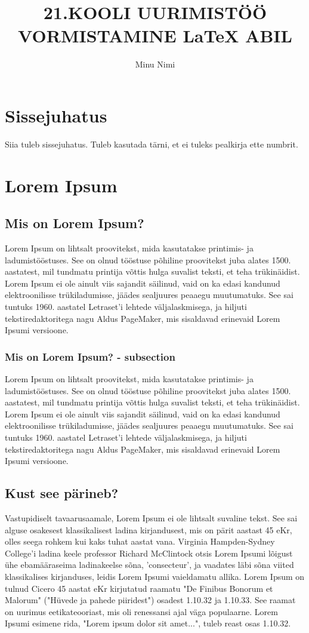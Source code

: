 \documentclass{21kuur}
\title{21.KOOLI UURIMISTÖÖ VORMISTAMINE LaTeX ABIL}
\author{Minu Nimi}
\begin{document}
\maketitle

\chapter*{Sissejuhatus}
Siia tuleb sissejuhatus. Tuleb kasutada tärni, et ei tuleks pealkirja ette numbrit. 


\chapter{Lorem Ipsum}

\section{Mis on Lorem Ipsum?}
Lorem Ipsum on lihtsalt proovitekst, mida kasutatakse printimis- ja ladumistööstuses. See on olnud tööstuse põhiline proovitekst juba alates 1500. aastatest, mil tundmatu printija võttis hulga suvalist teksti, et teha trükinäidist. Lorem Ipsum ei ole ainult viis sajandit säilinud, vaid on ka edasi kandunud elektroonilisse trükiladumisse, jäädes sealjuures peaaegu muutumatuks. See sai tuntuks 1960. aastatel Letraset'i lehtede väljalaskmisega, ja hiljuti tekstiredaktoritega nagu Aldus PageMaker, mis sisaldavad erinevaid Lorem Ipsumi versioone.

\subsection{Mis on Lorem Ipsum? - subsection}
Lorem Ipsum on lihtsalt proovitekst, mida kasutatakse printimis- ja ladumistööstuses. See on olnud tööstuse põhiline proovitekst juba alates 1500. aastatest, mil tundmatu printija võttis hulga suvalist teksti, et teha trükinäidist. Lorem Ipsum ei ole ainult viis sajandit säilinud, vaid on ka edasi kandunud elektroonilisse trükiladumisse, jäädes sealjuures peaaegu muutumatuks. See sai tuntuks 1960. aastatel Letraset'i lehtede väljalaskmisega, ja hiljuti tekstiredaktoritega nagu Aldus PageMaker, mis sisaldavad erinevaid Lorem Ipsumi versioone.

\section{Kust see pärineb?}
Vastupidiselt tavaarusaamale, Lorem Ipsum ei ole lihtsalt suvaline tekst. See sai alguse osakesest klassikalisest ladina kirjandusest, mis on pärit aastast 45 eKr, olles seega rohkem kui kaks tuhat aastat vana. Virginia Hampden-Sydney College'i ladina keele professor Richard McClintock otsis Lorem Ipsumi lõigust ühe ebamääraseima ladinakeelse sõna, 'consecteur', ja vaadates läbi sõna viited klassikalises kirjanduses, leidis Lorem Ipsumi vaieldamatu allika. Lorem Ipsum on tulnud Cicero 45 aastat eKr kirjutatud raamatu "De Finibus Bonorum et Malorum" ("Hüvede ja pahede piiridest") osadest 1.10.32 ja 1.10.33. See raamat on uurimus eetikateooriast, mis oli renessansi ajal väga populaarne. Lorem Ipsumi esimene rida, "Lorem ipsum dolor sit amet...", tuleb reast osas 1.10.32.
\end{document}
